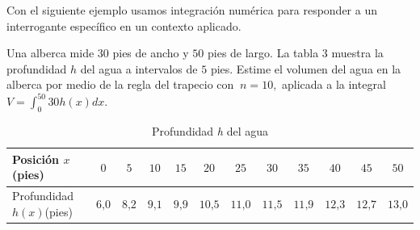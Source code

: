 


Con el siguiente ejemplo usamos integración numérica para responder a un interrogante específico en un contexto aplicado.

\begin{ejemplo} 
\textnormal{Una alberca mide $30$ pies de ancho y $50$ pies de largo. La tabla 3 muestra la profundidad $h$ del agua a intervalos de $5$ pies. Estime el volumen del agua en la alberca por medio de la regla del trapecio con \textit{$\ n=10,$} aplicada a la integral \textit{$V=\displaystyle\int_{0}^{50}30h(x)dx.$}}
\end{ejemplo}

\begin{table}[H]
	\caption{Profundidad \textit{h} del agua}
	
	\setlength{\tabcolsep}{3pt} 
	\begin{tabular}{|l|c|c|c|c|c|c|c|c|c|c|c|} %
		\hline
		Posición $x$(pies) & $0$ & $5$ &$10$ & $15$ & $20$ & $25$ & $30$ & $35$ & $40$ & $45$ & $50$\\
		\hline
		Profundidad $h(x)$(pies) & $6\text{,}0$& $8\text{,}2$ & $9\text{,}1$ & $9\text{,}9$ & $10\text{,}5$ & $11\text{,}0$ & $11\text{,}5$ & $11\text{,}9$ & $12\text{,}3$ & $12\text{,}7$ & $13\text{,}0$ \\ \hline
	\end{tabular}
	
\propia
	
\end{table}

